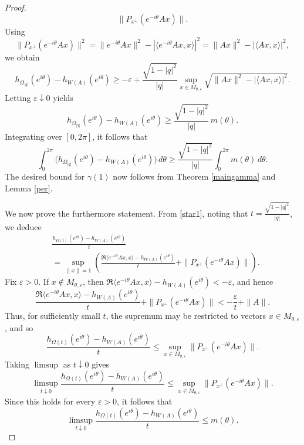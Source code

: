 \documentclass{article}
\begin{document}
\begin{proof}
\[\|P_{x^\perp}(e^{-i\theta}Ax)\|.
\]
Using
\[
\|P_{x^\perp}(e^{-i\theta}Ax)\|^2
=
\|e^{-i\theta}Ax\|^2-|\langle e^{-i\theta}Ax,x\rangle|^2
=
\|Ax\|^2-|\langle Ax,x\rangle|^2,
\]
we obtain
\[
h_{\Omega_{|q|}}(e^{i\theta})-h_{W(A)}(e^{i\theta})
\ge
-\varepsilon+
\frac{\sqrt{1-|q|^2}}{|q|}
\sup_{x\in M_{\theta,\varepsilon}}
\sqrt{\|Ax\|^2-|\langle Ax,x\rangle|^2}.
\]
Letting $\varepsilon\downarrow 0$ yields
\[
h_{\Omega_{|q|}}(e^{i\theta})-h_{W(A)}(e^{i\theta})
\ge
\frac{\sqrt{1-|q|^2}}{|q|}\,m(\theta).
\]
Integrating over $[0,2\pi]$, it follows that
\[
\int_0^{2\pi}
\bigl(h_{\Omega_{|q|}}(e^{i\theta})-h_{W(A)}(e^{i\theta})\bigr)\,d\theta
\ge
\frac{\sqrt{1-|q|^2}}{|q|}
\int_0^{2\pi} m(\theta)\,d\theta.
\]
The desired bound for $\gamma(1)$ now follows from Theorem \ref{maingamma} and Lemma \ref{per}.











We now prove the furthermore statement. From \eqref{star1}, noting that $
t=\frac{\sqrt{1-|q|^2}}{|q|}$, 
we deduce
\begin{align}
&\frac{h_{\Omega(t)}(e^{i\theta})-h_{W(A)}(e^{i\theta})}{t} \\
&=
\sup_{\|x\|=1}
\left(
\frac{\Re\langle e^{-i\theta}Ax,x\rangle-h_{W(A)}(e^{i\theta})}{t}
+
\|P_{x^\perp}(e^{-i\theta}Ax)\|
\right).
\end{align}
Fix $\varepsilon>0$. If $x\notin M_{\theta,\varepsilon}$, then $
\Re\langle e^{-i\theta}Ax,x\rangle-h_{W(A)}(e^{i\theta})<-\varepsilon$, 
and hence
\[
\frac{\Re\langle e^{-i\theta}Ax,x\rangle-h_{W(A)}(e^{i\theta})}{t}
+
\|P_{x^\perp}(e^{-i\theta}Ax)\|
<
-\frac{\varepsilon}{t}+\|A\|.
\]
Thus, for sufficiently small $t$, the supremum may be restricted to vectors
$x\in M_{\theta,\varepsilon}$, and so
\[
\frac{h_{\Omega(t)}(e^{i\theta})-h_{W(A)}(e^{i\theta})}{t}
\le
\sup_{x\in M_{\theta,\varepsilon}}
\|P_{x^\perp}(e^{-i\theta}Ax)\|.
\]
Taking $\limsup$ as $t\downarrow0$ gives
\[
\limsup_{t\downarrow0}
\frac{h_{\Omega(t)}(e^{i\theta})-h_{W(A)}(e^{i\theta})}{t}
\le
\sup_{x\in M_{\theta,\varepsilon}}
\|P_{x^\perp}(e^{-i\theta}Ax)\|.
\]
Since this holds for every $\varepsilon>0$, it follows that
\begin{equation}\label{eq1}
    \limsup_{t\downarrow0}
\frac{h_{\Omega(t)}(e^{i\theta})-h_{W(A)}(e^{i\theta})}{t}
\le
m(\theta).
\end{equation}


\end{proof}
\end{document}
